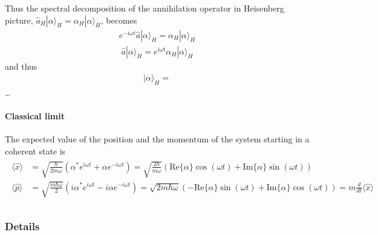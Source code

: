 \documentclass[letterpaper,10pt,english]{jupyterBook}
\begin{document}
\sphinxAtStartPar
Thus the spectral decomposition of the annihilation operator in Heisenberg picture, \(\hat{a}_H | \alpha \rangle_H = \alpha_H | \alpha \rangle_H\), becomes
\begin{equation*}
\begin{split}e^{-i \omega t} \hat{a} | \alpha \rangle_H = \alpha_H | \alpha \rangle_H \end{split}
\end{equation*}\begin{equation*}
\begin{split}\hat{a} | \alpha \rangle_H = e^{i \omega t} \alpha_H | \alpha \rangle_H \end{split}
\end{equation*}
\sphinxAtStartPar
and thus
\begin{equation*}
\begin{split}| \alpha \rangle_H = \end{split}
\end{equation*}
\sphinxAtStartPar
…


\paragraph{Classical limit}
\label{\detokenize{ch/quantum-mechanics/qft/harmonic-oscillator:id1}}
\sphinxAtStartPar
The expected value of the position and the momentum of the system starting in a coherent state is
\begin{equation*}
\begin{split}\begin{aligned}
 \langle \hat{x} \rangle & = \sqrt{\frac{\hbar}{2 m \omega}} \left( \alpha^* e^{i \omega t} + \alpha e^{-i \omega t} \right) = \sqrt{\frac{2 \hbar} {m \omega}} \left( \text{Re}\{ \alpha \} \cos(\omega t) + \text{Im}\{ \alpha \} \sin(\omega t) \right) \\
 \langle \hat{p} \rangle & = \sqrt{\frac{m \hbar \omega}{2}} \left( i \alpha^* e^{i \omega t} - i \alpha e^{-i \omega t} \right) = \sqrt{2 m \hbar \omega} \left( - \text{Re}\{ \alpha \} \sin(\omega t) + \text{Im}\{ \alpha \} \cos(\omega t) \right) = m \frac{d}{dt} \langle \hat{x} \rangle \\
\end{aligned}\end{split}
\end{equation*}\subsubsection*{Details}
\end{document}
